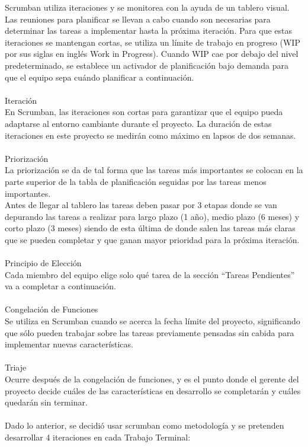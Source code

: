 \documentclass[12pt, a4paper, titlepage]{report}
\begin{document}
	    Scrumban utiliza iteraciones y se monitorea con la ayuda de un tablero visual. Las reuniones para planificar se llevan a cabo cuando son necesarias para determinar las tareas a implementar hasta la próxima iteración. Para que estas iteraciones se mantengan cortas, se utiliza un límite de trabajo en progreso (WIP por sus siglas en inglés Work in Progress). Cuando WIP cae por debajo del nivel predeterminado, se establece un activador de planificación bajo demanda para que el equipo sepa cuándo planificar a continuación.\\
	    \\
	    Iteración\\
	    En Scrumban, las iteraciones son cortas para garantizar que el equipo pueda adaptarse al entorno cambiante durante el proyecto. La duración de estas iteraciones en este proyecto se medirán como máximo en lapsos de dos semanas.\\
	    \\
	    Priorización\\
	    La priorización se da de tal forma que las tareas más importantes se colocan en la parte superior de la tabla de planificación seguidas por las tareas menos importantes.\\
	    Antes de llegar al tablero las tareas deben pasar por 3 etapas donde se van depurando las tareas a realizar para largo plazo (1 año), medio plazo (6 meses) y corto plazo (3 meses) siendo de esta última de donde salen las tareas más claras que se pueden completar y que ganan mayor prioridad para la próxima iteración.\\
	    \\
	    Principio de Elección\\
	    Cada miembro del equipo elige solo qué tarea de la sección “Tareas Pendientes” va a completar a continuación.\\
	    \\
	    Congelación de Funciones\\
	    Se utiliza en Scrumban cuando se acerca la fecha límite del proyecto, significando que sólo pueden trabajar sobre las tareas previamente pensadas sin cabida para implementar nuevas características.\\
	    \\
	    Triaje\\
	    Ocurre después de la congelación de funciones, y es el punto donde el gerente del proyecto decide cuáles de las características en desarrollo se completarán y cuáles quedarán sin terminar.\\
	    \\
	    Dado lo anterior, se decidió usar scrumban como metodología y se pretenden desarrollar 4 iteraciones en cada Trabajo Terminal:\\
	    \\
	    
\end{document}
